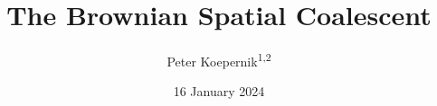 \documentclass[reqno,draft]{amsart}
\title{The Brownian Spatial Coalescent}
\author{Peter Koepernik\textsuperscript{1,2}}
\date{16 January 2024}
\numberwithin{equation}{section}
\theoremstyle{plain}
\theoremstyle{remark}
\begin{document}
\begin{abstract}
% 
% 
% 




\end{abstract}
\end{document}
